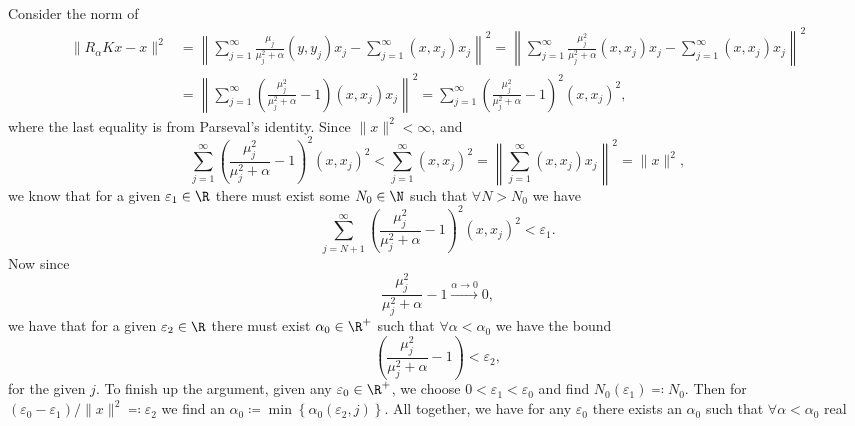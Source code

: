 Consider the norm of \[
    \begin{split}
        \| R_{\alpha} K x - x \|^2 &= \left\| \sum_{j = 1}^{\infty} \frac{\mu_j}{\mu_j^2 + \alpha} (y, y_j) x_j - \sum_{j
    = 1}^{\infty} (x, x_j) x_j \right\|^2 = \left\|\sum_{j = 1}^{\infty} \frac{\mu_j^2}{\mu_j^2 + \alpha} (x, x_j) x_j - \sum_{j
        = 1}^{\infty} (x, x_j) x_j \right\|^2 \\ 
                                   &= \left\| \sum_{j = 1}^{\infty} \left( \frac{\mu_j^2}{\mu_j^2 + \alpha} - 1\right)(x,
                                   x_j) x_j \right\|^2 = \sum_{j = 1}^{\infty} \left( \frac{\mu_j^2}{\mu_j^2 + \alpha}
                                   - 1  \right)^2 (x, x_j)^2,
    \end{split}
\]  where the last equality is from Parseval's identity.
Since \(\|x\|^2 < \infty\), and \[
    \sum_{j = 1}^{\infty} \left( \frac{\mu_j^2}{\mu_j^2 + \alpha} - 1  \right)^2  (x, x_j)^2 < \sum_{j
    = 1}^{\infty} (x, x_j)^2 =  \left\|\sum_{j = 1}^{\infty} (x, x_j) x_j\right\|^2 = \|x\|^2,
\]  we know that for a given \(\varepsilon_1 \in \R\) there must exist some \(N_0 \in \N\) such that \(\forall N > N_0\) we have \[
    \sum_{j = N+1}^{\infty} \left( \frac{\mu_j^2}{\mu_j^2 + \alpha} - 1  \right)^2  (x, x_j)^2 < \varepsilon_1.
\] 
Now since \[
    \frac{\mu_j^2}{\mu_j^2 + \alpha} - 1  \xrightarrow{\alpha \to 0} 0,
\] we have that for a given \(\varepsilon_2 \in \R\) there must exist \(\alpha_0 \in \R^{+}\) such that \(\forall \alpha
    < \alpha_0\) we have the bound \[
    \left( \frac{\mu_j^2}{\mu_j^2 + \alpha} - 1 \right)  < \varepsilon_2,
    \] for the given \(j\).
To finish up the argument, given any \(\varepsilon_0 \in \R^{+}\), we choose \(0 < \varepsilon_1 < \varepsilon_0\) and
    find \(N_0(\varepsilon_1) \eqqcolon N_0\).
Then for \( (\varepsilon_0 - \varepsilon_1)/\|x\|^2 \eqqcolon \varepsilon_2 \) 
we find an \(\alpha_0 \coloneqq \min \left\{ \alpha_0(\varepsilon_2, j) \right\}\).
All together, we have for any \(\varepsilon_0\) there exists an \(\alpha_0\) such that \(\forall \alpha < \alpha_0\) real
